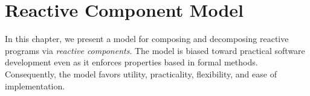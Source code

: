 \chapter{Reactive Component Model \label{model}}

In this chapter, we present a model for composing and decomposing reactive programs via \emph{reactive components}.
The model is biased toward practical software development even as it enforces properties based in formal methods.
Consequently, the model favors utility, practicality, flexibility, and ease of implementation.



